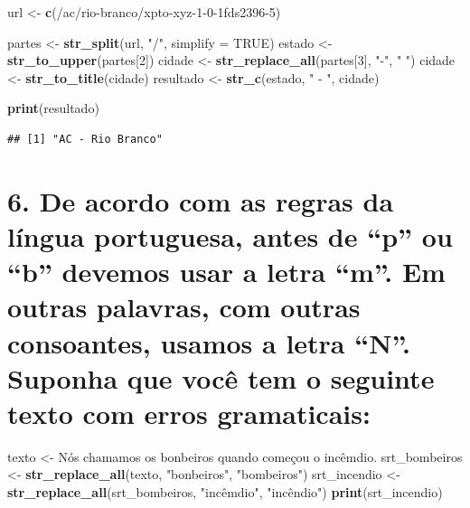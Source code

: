 \documentclass[
]{article}
\newenvironment{Shaded}{\begin{snugshade}}{\end{snugshade}}
\newcommand{\AttributeTok}[1]{\textcolor[rgb]{0.13,0.29,0.53}{#1}}
\newcommand{\ConstantTok}[1]{\textcolor[rgb]{0.56,0.35,0.01}{#1}}
\newcommand{\DecValTok}[1]{\textcolor[rgb]{0.00,0.00,0.81}{#1}}
\newcommand{\FunctionTok}[1]{\textcolor[rgb]{0.13,0.29,0.53}{\textbf{#1}}}
\newcommand{\NormalTok}[1]{#1}
\newcommand{\OtherTok}[1]{\textcolor[rgb]{0.56,0.35,0.01}{#1}}
\newcommand{\StringTok}[1]{\textcolor[rgb]{0.31,0.60,0.02}{#1}}
\begin{document}
\begin{Shaded}
\begin{Highlighting}[]
\NormalTok{url }\OtherTok{\textless{}{-}} \FunctionTok{c}\NormalTok{(}\StringTok{\textquotesingle{}/ac/rio{-}branco/xpto{-}xyz{-}1{-}0{-}1fds2396{-}5\textquotesingle{}}\NormalTok{)}

\NormalTok{partes }\OtherTok{\textless{}{-}} \FunctionTok{str\_split}\NormalTok{(url, }\StringTok{"/"}\NormalTok{, }\AttributeTok{simplify =} \ConstantTok{TRUE}\NormalTok{)}
\NormalTok{estado }\OtherTok{\textless{}{-}} \FunctionTok{str\_to\_upper}\NormalTok{(partes[}\DecValTok{2}\NormalTok{])}
\NormalTok{cidade }\OtherTok{\textless{}{-}} \FunctionTok{str\_replace\_all}\NormalTok{(partes[}\DecValTok{3}\NormalTok{], }\StringTok{"{-}"}\NormalTok{, }\StringTok{" "}\NormalTok{)}
\NormalTok{cidade }\OtherTok{\textless{}{-}} \FunctionTok{str\_to\_title}\NormalTok{(cidade)}
\NormalTok{resultado }\OtherTok{\textless{}{-}} \FunctionTok{str\_c}\NormalTok{(estado, }\StringTok{" {-} "}\NormalTok{, cidade)}

\FunctionTok{print}\NormalTok{(resultado)}
\end{Highlighting}
\end{Shaded}

\begin{verbatim}
## [1] "AC - Rio Branco"
\end{verbatim}

\section{6. De acordo com as regras da língua portuguesa, antes de ``p''
ou ``b'' devemos usar a letra ``m''. Em outras palavras, com outras
consoantes, usamos a letra ``N''. Suponha que você tem o seguinte texto
com erros
gramaticais:}\label{de-acordo-com-as-regras-da-luxedngua-portuguesa-antes-de-p-ou-b-devemos-usar-a-letra-m.-em-outras-palavras-com-outras-consoantes-usamos-a-letra-n.-suponha-que-vocuxea-tem-o-seguinte-texto-com-erros-gramaticais}

\begin{Shaded}
\begin{Highlighting}[]
\NormalTok{texto }\OtherTok{\textless{}{-}} \StringTok{\textquotesingle{}Nós chamamos os bonbeiros quando começou o incêmdio.\textquotesingle{}}
\NormalTok{srt\_bombeiros }\OtherTok{\textless{}{-}} \FunctionTok{str\_replace\_all}\NormalTok{(texto, }\StringTok{"bonbeiros"}\NormalTok{, }\StringTok{"bombeiros"}\NormalTok{)}
\NormalTok{srt\_incendio }\OtherTok{\textless{}{-}} \FunctionTok{str\_replace\_all}\NormalTok{(srt\_bombeiros, }\StringTok{"incêmdio"}\NormalTok{, }\StringTok{"incêndio"}\NormalTok{)}
\FunctionTok{print}\NormalTok{(srt\_incendio)}
\end{Highlighting}
\end{Shaded}
\end{document}
